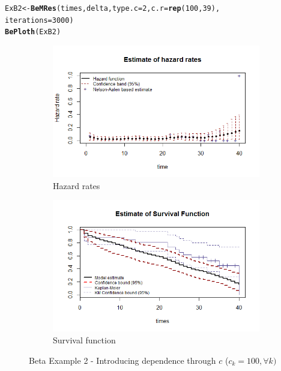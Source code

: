 \documentclass[letterpaper]{article}\usepackage[]{graphicx}\usepackage[]{xcolor}
\makeatletter
\newcommand{\hlnum}[1]{\textcolor[rgb]{0.686,0.059,0.569}{#1}}%
\newcommand{\hlstd}[1]{\textcolor[rgb]{0.345,0.345,0.345}{#1}}%
\newcommand{\hlkwb}[1]{\textcolor[rgb]{0.69,0.353,0.396}{#1}}%
\newcommand{\hlkwc}[1]{\textcolor[rgb]{0.333,0.667,0.333}{#1}}%
\newcommand{\hlkwd}[1]{\textcolor[rgb]{0.737,0.353,0.396}{\textbf{#1}}}%
\newenvironment{kframe}{%
 \def\at@end@of@kframe{}%
 \ifinner\ifhmode%
  \def\at@end@of@kframe{\end{minipage}}%
  \begin{minipage}{\columnwidth}%
 \fi\fi%
 \def\FrameCommand##1{\hskip\@totalleftmargin \hskip-\fboxsep
 \colorbox{shadecolor}{##1}\hskip-\fboxsep
     \hskip-\linewidth \hskip-\@totalleftmargin \hskip\columnwidth}%
 \MakeFramed {\advance\hsize-\width
   \@totalleftmargin\z@ \linewidth\hsize
   \@setminipage}}%
 {\par\unskip\endMakeFramed%
 \at@end@of@kframe}
\newenvironment{knitrout}{}{} %
\makeatother
\begin{document}
\begin{knitrout}
\color{fgcolor}\begin{kframe}
\begin{alltt}
\hlstd{ExB2} \hlkwb{<-} \hlkwd{BeMRes}\hlstd{(times, delta,} \hlkwc{type.c} \hlstd{=} \hlnum{2}\hlstd{,} \hlkwc{c.r} \hlstd{=} \hlkwd{rep}\hlstd{(}\hlnum{100}\hlstd{,} \hlnum{39}\hlstd{),}
               \hlkwc{iterations} \hlstd{=} \hlnum{3000}\hlstd{)}
\hlkwd{BePloth}\hlstd{(ExB2)}
\end{alltt}
\end{kframe}
\end{knitrout}

\begin{figure}
  \centering
  \begin{subfigure}[a]{\textwidth}\centering
    \includegraphics[width=\textwidth]{B21.png}
    \caption{Hazard rates}
  \end{subfigure}
  \begin{subfigure}[b]{\textwidth}\centering
    \includegraphics[width=\textwidth]{B22.png}
    \caption{Survival function}
  \end{subfigure}
  \caption{Beta Example 2 - Introducing dependence through $c$ ($c_k=100, \forall k)$}
  \label{fig:B2}
\end{figure}
\end{document}
